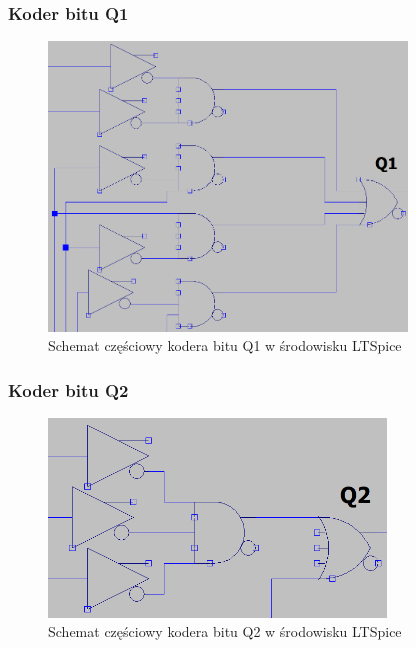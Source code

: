 \documentclass{article}
\begin{document}
\subsubsection{Koder bitu Q1}
\begin{figure}[H]
    \centering
    \begin{adjustbox}{center}
        \includegraphics[width=0.85\textwidth]{q1.png}
    \end{adjustbox}
    \caption{Schemat częściowy kodera bitu Q1 w środowisku LTSpice}
    \label{fig:mojobrazek}
\end{figure}

\subsubsection{Koder bitu Q2}
\begin{figure}[H]
    \centering
    \begin{adjustbox}{center}
        \includegraphics[width=0.8\textwidth]{q2.png}
    \end{adjustbox}
    \caption{Schemat częściowy kodera bitu Q2 w środowisku LTSpice}
    \label{fig:mojobrazek}
\end{figure}
\end{document}
